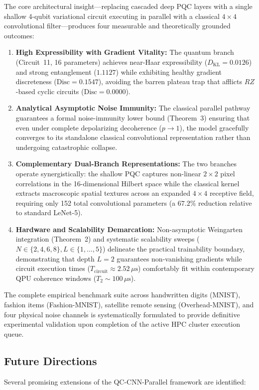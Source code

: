 \documentclass[pdflatex,sn-mathphys-num]{sn-jnl}%
\theoremstyle{thmstyleone}%
\theoremstyle{thmstyletwo}%
\theoremstyle{thmstylethree}%
\begin{document}
The core architectural insight---replacing cascaded deep PQC layers with a single shallow 4-qubit variational circuit executing in parallel with a classical $4 \times 4$ convolutional filter---produces four measurable and theoretically grounded outcomes:
\begin{enumerate}
    \item \textbf{High Expressibility with Gradient Vitality:} The quantum branch (Circuit~11, 16 parameters) achieves near-Haar expressibility ($D_{\mathrm{KL}} = 0.0126$) and strong entanglement ($1.1127$) while exhibiting healthy gradient discreteness ($\mathrm{Disc} = 0.1547$), avoiding the barren plateau trap that afflicts $RZ$-based cyclic circuits ($\mathrm{Disc} = 0.0000$).
    \item \textbf{Analytical Asymptotic Noise Immunity:} The classical parallel pathway guarantees a formal noise-immunity lower bound (Theorem~3) ensuring that even under complete depolarizing decoherence ($p \to 1$), the model gracefully converges to its standalone classical convolutional representation rather than undergoing catastrophic collapse.
    \item \textbf{Complementary Dual-Branch Representations:} The two branches operate synergistically: the shallow PQC captures non-linear $2 \times 2$ pixel correlations in the 16-dimensional Hilbert space while the classical kernel extracts macroscopic spatial textures across an expanded $4 \times 4$ receptive field, requiring only 152 total convolutional parameters (a $67.2\%$ reduction relative to standard LeNet-5).
    \item \textbf{Hardware and Scalability Demarcation:} Non-asymptotic Weingarten integration (Theorem~2) and systematic scalability sweeps ($N \in \{2,4,6,8\}, L \in \{1,\dots,5\}$) delineate the practical trainability boundary, demonstrating that depth $L = 2$ guarantees non-vanishing gradients while circuit execution times ($T_{\mathrm{circuit}} \approx 2.52\,\mu\mathrm{s}$) comfortably fit within contemporary QPU coherence windows ($T_2 \sim 100\,\mu\mathrm{s}$).
\end{enumerate}

The complete empirical benchmark suite across handwritten digits (MNIST), fashion items (Fashion-MNIST), satellite remote sensing (Overhead-MNIST), and four physical noise channels is systematically formulated to provide definitive experimental validation upon completion of the active HPC cluster execution queue.

\subsection{Future Directions}
Several promising extensions of the QC-CNN-Parallel framework are identified:
\end{document}
